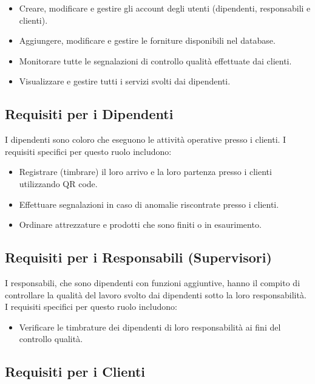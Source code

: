 \documentclass[twoside]{supsistudent}
\begin{document}
\begin{itemize}
  \item Creare, modificare e gestire gli account degli utenti (dipendenti, responsabili e clienti).
  \item Aggiungere, modificare e gestire le forniture disponibili nel database.
  \item Monitorare tutte le segnalazioni di controllo qualità effettuate dai clienti.
  \item Visualizzare e gestire tutti i servizi svolti dai dipendenti.
\end{itemize}

\subsection{Requisiti per i Dipendenti}

I dipendenti sono coloro che eseguono le attività operative presso i clienti. I requisiti specifici per questo ruolo includono:

\begin{itemize}
  \item Registrare (timbrare) il loro arrivo e la loro partenza presso i clienti utilizzando QR code.
  \item Effettuare segnalazioni in caso di anomalie riscontrate presso i clienti.
  \item Ordinare attrezzature e prodotti che sono finiti o in esaurimento.
\end{itemize}

\subsection{Requisiti per i Responsabili (Supervisori)}

I responsabili, che sono dipendenti con funzioni aggiuntive, hanno il compito di controllare la qualità del lavoro svolto dai dipendenti sotto la loro responsabilità. I requisiti specifici per questo ruolo includono:

\begin{itemize}
  \item Verificare le timbrature dei dipendenti di loro responsabilità ai fini del controllo qualità.
\end{itemize}

\subsection{Requisiti per i Clienti}
\end{document}
